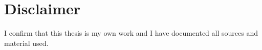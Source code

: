 \section*{Disclaimer}

\thispagestyle{empty}
\vspace*{0.8\textheight}
\noindent
I confirm that this \MakeLowercase{thesis} is my own work and I have documented all sources and material used.

\vspace{15mm}
\noindent

\cleardoublepage{}
